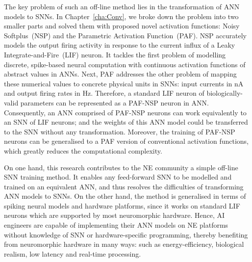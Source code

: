 The key problem of such an off-line method lies in the transformation of ANN models to SNNs.
In Chapter~\ref{cha:Conv}, we broke down the problem into two smaller parts and solved them with proposed novel activation functions: Noisy Softplus~(NSP) and the Parametric Activation Function~(PAF).
NSP accurately models the output firing activity in response to the current influx of a Leaky Integrate-and-Fire~(LIF) neuron.
It tackles the first problem of modelling discrete, spike-based neural computation with continuous activation functions of abstract values in ANNs.
Next, PAF addresses the other problem of mapping these numerical values to concrete physical units in SNNs: input currents in nA and output firing rates in Hz.
Therefore, a standard LIF neuron of biologically-valid parameters can be represented as a PAF-NSP neuron in ANN.
Consequently, an ANN comprised of PAF-NSP neurons can work equivalently to an SNN of LIF neurons; and the weights of this ANN model could be transferred to the SNN without any transformation.
Moreover, the training of PAF-NSP neurons can be generalised to a PAF version of conventional activation functions, which greatly reduces the computational complexity.


On one hand, this research contributes to the NE community a simple off-line SNN training method.
It enables any feed-forward SNN to be modelled and trained on an equivalent ANN, and thus resolves the difficulties of transforming ANN models to SNNs.
On the other hand, the method is generalised in terms of spiking neural models and hardware platforms, since it works on standard LIF neurons which are supported by most neuromorphic hardware.
Hence, AI engineers are capable of implementing their ANN models on NE platforms without knowledge of SNN or hardware-specific programming, thereby benefiting from neuromorphic hardware in many ways: such as energy-efficiency, biological realism, low latency and real-time processing.


